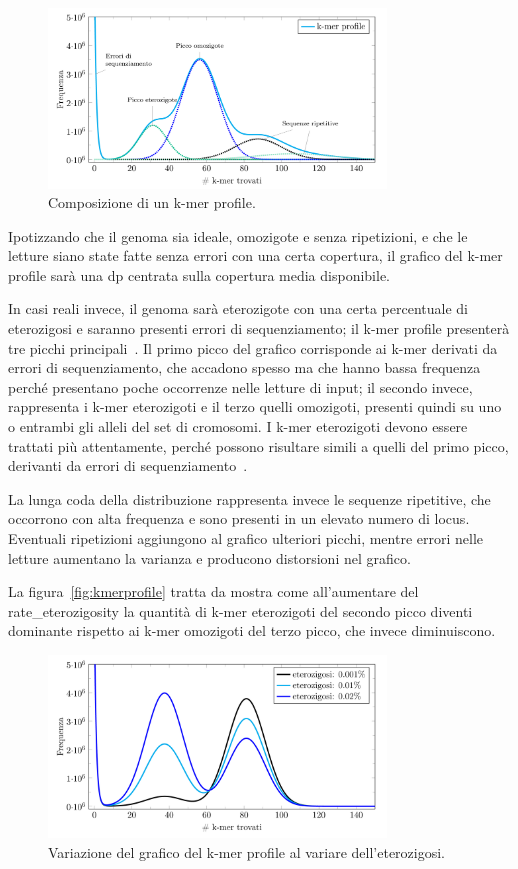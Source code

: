 \documentclass[crop=false, class=book]{standalone}
\begin{document}
	
	\begin{figure}[h]
		\centering
		\includegraphics[width=0.8\textwidth]{capitoli/introduzione/profilecomp.png}
		\caption{Composizione di un k-mer profile.}
		\label{fig:profilecomp}
	\end{figure}
	
	Ipotizzando che il genoma sia ideale, omozigote e senza ripetizioni, e che le letture siano state fatte senza errori con una certa copertura, il grafico del k-mer profile sarà una \gls{dp} centrata sulla copertura media disponibile.
	
	In casi reali invece, il genoma sarà eterozigote con una certa percentuale di eterozigosi e saranno presenti errori di sequenziamento; il k-mer profile presenterà tre picchi principali~\cite{sun2017findGSE}.
	Il primo picco del grafico corrisponde ai k-mer derivati da errori di sequenziamento, che accadono spesso ma che hanno bassa frequenza perché presentano poche occorrenze nelle letture di input; il secondo invece, rappresenta i k-mer eterozigoti e il terzo quelli omozigoti, presenti quindi su uno o entrambi gli alleli del set di cromosomi. I k-mer eterozigoti devono essere trattati più attentamente, perché possono risultare simili a quelli del primo picco, derivanti da errori di sequenziamento~\cite{sohn2016present}.	
	
	La lunga coda della distribuzione rappresenta invece le sequenze ripetitive, che occorrono con alta frequenza e sono presenti in un elevato numero di \gls{locus}. Eventuali ripetizioni aggiungono al grafico ulteriori picchi, mentre errori nelle letture aumentano la varianza e producono distorsioni nel grafico.
	
	La figura~\vref{fig:kmerprofile} tratta da \cite{vurture2017genomescope} mostra come all'aumentare del \gls{rate_eterozigosity} la quantità di k-mer eterozigoti del secondo picco diventi dominante rispetto ai k-mer omozigoti del terzo picco, che invece diminuiscono.
	
	\begin{figure}
		\centering
		\includegraphics[width=0.8\textwidth]{capitoli/introduzione/kmerprofile.png}
		\caption{Variazione del grafico del k-mer profile al variare dell'eterozigosi.}
		\label{fig:kmerprofile}
	\end{figure}

	
	
	
	
\end{document}
